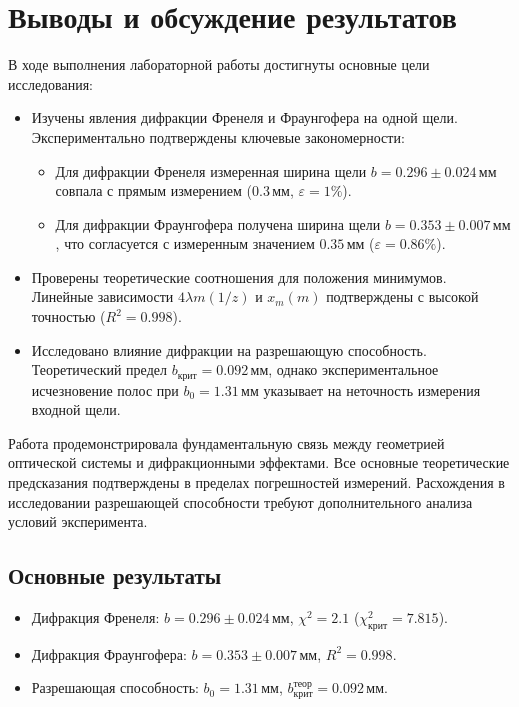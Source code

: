 \section{Выводы и обсуждение результатов}

В ходе выполнения лабораторной работы достигнуты основные цели исследования:  
\begin{itemize}  
    \item Изучены явления дифракции Френеля и Фраунгофера на одной щели. Экспериментально подтверждены ключевые закономерности:  
    \begin{itemize}  
        \item Для дифракции Френеля измеренная ширина щели \( b = 0.296 \pm 0.024 \, \text{мм} \) совпала с прямым измерением (\( 0.3 \, \text{мм} \), \( \varepsilon = 1\% \)).  
        \item Для дифракции Фраунгофера получена ширина щели \( b = 0.353 \pm 0.007 \, \text{мм} \), что согласуется с измеренным значением \( 0.35 \, \text{мм} \) (\( \varepsilon = 0.86\% \)).  
    \end{itemize}  

    \item Проверены теоретические соотношения для положения минимумов. Линейные зависимости \( 4\lambda m(1/z) \) и \( x_m(m) \) подтверждены с высокой точностью (\( R^2 = 0.998 \)).  

    \item Исследовано влияние дифракции на разрешающую способность. Теоретический предел \( b_{\text{крит}} = 0.092 \, \text{мм} \), однако экспериментальное исчезновение полос при \( b_0 = 1.31 \, \text{мм} \) указывает на неточность измерения входной щели.
\end{itemize}  

Работа продемонстрировала фундаментальную связь между геометрией оптической системы и дифракционными эффектами. Все основные теоретические предсказания подтверждены в пределах погрешностей измерений. Расхождения в исследовании разрешающей способности требуют дополнительного анализа условий эксперимента.  

\subsection*{Основные результаты}  
\begin{itemize}  
    \item Дифракция Френеля: \( b = 0.296 \pm 0.024 \, \text{мм} \), \( \chi^2 = 2.1 \) (\( \chi^2_{\text{крит}} = 7.815 \)).  
    \item Дифракция Фраунгофера: \( b = 0.353 \pm 0.007 \, \text{мм} \), \( R^2 = 0.998 \).  
    \item Разрешающая способность: \( b_0 = 1.31 \, \text{мм} \), \( b_{\text{крит}}^{\text{теор}} = 0.092 \, \text{мм} \).  
\end{itemize}  
